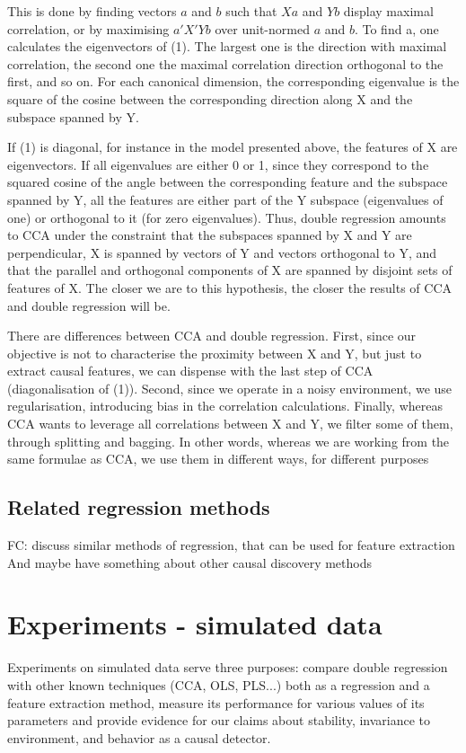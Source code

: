 \documentclass{article}
\begin{document}
This is done by finding vectors $a$ and $b$ such that $Xa$ and $Yb$ display maximal correlation, or by maximising $a'X'Yb$ over unit-normed $a$ and $b$.
%
To find a, one calculates the eigenvectors of (1).
%
The largest one is the direction with maximal correlation, the second one the maximal correlation direction orthogonal to the first, and so on.
%
For each canonical dimension, the corresponding eigenvalue is the square of the cosine between the corresponding direction along X and the subspace spanned by Y.

If (1) is diagonal, for instance in the model presented above, the features of X are eigenvectors.
%
If all eigenvalues are either 0 or 1, since they correspond to the squared cosine of the angle between the corresponding feature and the subspace spanned by Y, all the features are either part of the Y subspace (eigenvalues of one) or orthogonal to it (for zero eigenvalues).
%
Thus, double regression amounts to CCA under the constraint that the subspaces spanned by X and Y are perpendicular, X is spanned by vectors of Y and vectors orthogonal to Y, and that the parallel and orthogonal components of X are spanned by disjoint sets of features of X.
%
The closer we are to this hypothesis, the closer the results of CCA and double regression will be.

There are differences between CCA and double regression.
%
First, since our objective is not to characterise the proximity between X and Y, but just to extract causal features, we can dispense with the last step of CCA (diagonalisation of (1)).
%
Second, since we operate in a noisy environment, we use regularisation, introducing bias in the correlation calculations.
%
Finally, whereas CCA wants to leverage all correlations between X and Y, we filter some of them, through splitting and bagging.
%
In other words, whereas we are working from the same formulae as CCA, we use them in different ways, for different purposes

\subsection{Related regression methods}
FC: discuss similar methods of regression, that can be used for feature extraction
And maybe have something about other causal discovery methods

\section{Experiments - simulated data}
Experiments on simulated data serve three purposes: compare double regression with other known techniques (CCA, OLS, PLS...) both as a regression and a feature extraction method, measure its performance for various values of its parameters and provide evidence for our claims about stability, invariance to environment, and behavior as a causal detector.
\end{document}
